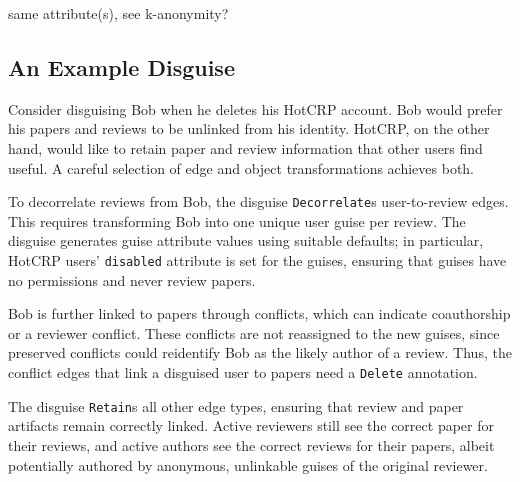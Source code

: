 same attribute(s), see k-anonymity?
%

\subsection{An Example Disguise}
\label{design:eg}
%
Consider disguising Bob when he deletes his HotCRP account.
%
Bob would prefer his papers and reviews to be unlinked from his identity.
%
HotCRP, on the other hand, would like to retain paper and review information that other users
find useful.
%
A careful selection of edge and object transformations achieves both.
%

%
To decorrelate reviews from Bob, the disguise \texttt{Decorrelate}s user-to-review edges.
%
This requires transforming Bob into one unique user guise per review.
%
The disguise generates guise attribute values using suitable defaults;
%
in particular, HotCRP users' \texttt{disabled} attribute is set for the guises,
ensuring that guises have no permissions and never review papers.
%

%
Bob is further linked to papers through conflicts, which can indicate coauthorship or a
reviewer conflict.
%
These conflicts are not reassigned to the new guises, since preserved
conflicts could reidentify Bob as the likely author of a review. Thus, the
conflict edges that link a disguised user to papers need a \texttt{Delete} annotation.
%

The disguise \texttt{Retain}s all other edge types, ensuring that review and paper
artifacts remain correctly linked. Active reviewers still see the correct paper for their reviews,
and active authors see the correct reviews for their papers, albeit potentially authored by
anonymous, unlinkable guises of the original reviewer.
%
%

